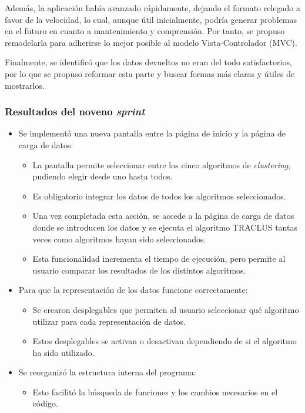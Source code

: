 Además, la aplicación había avanzado rápidamente, dejando el formato relegado a favor de la velocidad, lo cual, aunque útil inicialmente, podría generar problemas en el futuro en cuanto a mantenimiento y comprensión. Por tanto, se propuso remodelarla para adherirse lo mejor posible al modelo Vista-Controlador (MVC).

Finalmente, se identificó que los datos devueltos no eran del todo satisfactorios, por lo que se propuso reformar esta parte y buscar formas más claras y útiles de mostrarlos.

\subsubsection{Resultados del noveno \textit{sprint}}

\begin{itemize}
    \item Se implementó una nueva pantalla entre la página de inicio y la página de carga de datos:
    \begin{itemize}
        \item La pantalla permite seleccionar entre los cinco algoritmos de \textit{clustering}, pudiendo elegir desde uno hasta todos.
        \item Es obligatorio integrar los datos de todos los algoritmos seleccionados.
        \item Una vez completada esta acción, se accede a la página de carga de datos donde se introducen los datos y se ejecuta el algoritmo TRACLUS tantas veces como algoritmos hayan sido seleccionados.
        \item Esta funcionalidad incrementa el tiempo de ejecución, pero permite al usuario comparar los resultados de los distintos algoritmos.
    \end{itemize}
    
    \item Para que la representación de los datos funcione correctamente:
    \begin{itemize}
        \item Se crearon desplegables que permiten al usuario seleccionar qué algoritmo utilizar para cada representación de datos.
        \item Estos desplegables se activan o desactivan dependiendo de si el algoritmo ha sido utilizado.
    \end{itemize}
    
    \item Se reorganizó la estructura interna del programa:
    \begin{itemize}
        \item Esto facilitó la búsqueda de funciones y los cambios necesarios en el código.
    \end{itemize}
\end{itemize}    

